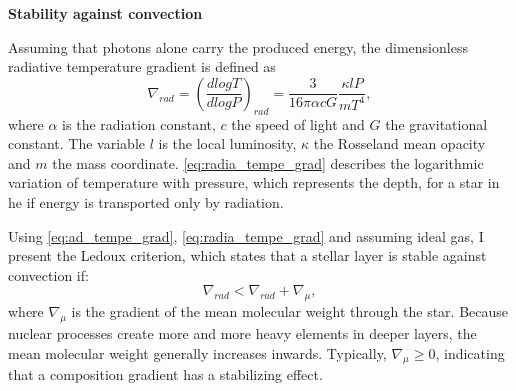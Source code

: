 {\bf Stability against convection}


Assuming that photons alone carry the produced energy, the dimensionless radiative temperature gradient is defined as
\begin{equation}\label{eq:radia_tempe_grad}
    \nabla_{rad} = \left ( \frac{d logT}{d logP} \right)_{rad} = \frac{3}{16 \pi \alpha c G} \frac{\kappa l P}{m T^4},
\end{equation}
where $\alpha$ is the radiation constant, $c$ the speed of light and $G$ the gravitational constant. The variable $l$ is the local luminosity, $\kappa$ the Rosseland mean opacity and $m$ the mass coordinate.  \cref{eq:radia_tempe_grad} describes the logarithmic variation of temperature with pressure, which represents the depth, for a star in \ac{he} if energy is transported only by radiation.

Using \cref{eq:ad_tempe_grad}, \cref{eq:radia_tempe_grad} and assuming ideal gas, I present the Ledoux criterion,  which states that a stellar layer is stable against convection if:
\begin{equation}\label{eq:Ledoux_criterion}
    \nabla_{rad} < \nabla_{rad} +  \nabla_{\mu},
\end{equation}
where $\nabla_{\mu}$ is the gradient of the mean molecular weight through the star. Because nuclear processes create more and more heavy elements in deeper layers, the mean molecular weight generally increases inwards. Typically, $\nabla_{\mu} \geq 0$, indicating that a composition gradient has a stabilizing effect.

